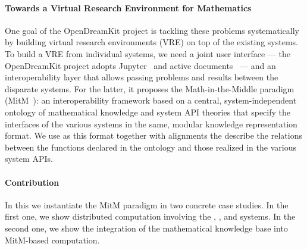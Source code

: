 \paragraph{Towards a Virtual Research Environment for Mathematics}
One goal of the OpenDreamKit project is tackling these problems systematically by building virtual research environments (VRE) on top of the existing systems.
To build a VRE from individual systems, we need a joint user interface --- the OpenDreamKit project adopts Jupyter~\cite{jupyter-project:on} and active documents~\cite{KohDavGin:psewads11} --- and an interoperability layer that allows passing problems and results between the disparate systems.
For the latter, it proposes the Math-in-the-Middle paradigm (MitM~\cite{DehKohKon:iop16}): an interoperability framework based on a central, system-independent ontology of mathematical knowledge and system API theories that specify the interfaces of the various systems in the same, modular knowledge representation format.
We use \ommt as this format together with alignments the describe the relations between the functions declared in the ontology and those realized in the various system APIs.

\paragraph{Contribution}
In this \papertype we instantiate the MitM paradigm in two concrete case studies.
In the first one, we show distributed computation involving the \GAP, \Sage, and \Singular systems.
In the second one, we show the integration of the mathematical knowledge base \LMFDB into MitM-based computation.

